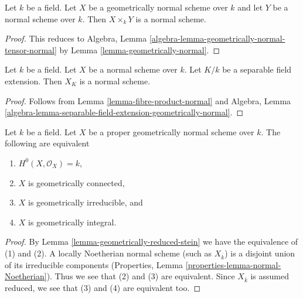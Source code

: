\begin{lemma}
\label{lemma-fibre-product-normal}
Let $k$ be a field. Let $X$ be a geometrically normal scheme over $k$
and let $Y$ be a normal scheme over $k$. Then $X \times_k Y$ is a normal
scheme.
\end{lemma}

\begin{proof}
This reduces to
Algebra, Lemma \ref{algebra-lemma-geometrically-normal-tensor-normal}
by
Lemma \ref{lemma-geometrically-normal}.
\end{proof}

\begin{lemma}
\label{lemma-base-change-normal-by-separable}
Let $k$ be a field. Let $X$ be a normal scheme over $k$. Let $K/k$
be a separable field extension. Then $X_K$ is a normal scheme.
\end{lemma}

\begin{proof}
Follows from Lemma \ref{lemma-fibre-product-normal} and
Algebra, Lemma
\ref{algebra-lemma-separable-field-extension-geometrically-normal}.
\end{proof}

\begin{lemma}
\label{lemma-geometrically-normal-stein}
Let $k$ be a field. Let $X$ be a proper geometrically normal scheme over $k$.
The following are equivalent
\begin{enumerate}
\item $H^0(X, \mathcal{O}_X) = k$,
\item $X$ is geometrically connected,
\item $X$ is geometrically irreducible, and
\item $X$ is geometrically integral.
\end{enumerate}
\end{lemma}

\begin{proof}
By Lemma \ref{lemma-geometrically-reduced-stein} we have the
equivalence of (1) and (2). A locally Noetherian normal scheme
(such as $X_{\overline{k}}$) is a disjoint union of
its irreducible components
(Properties, Lemma \ref{properties-lemma-normal-Noetherian}).
Thus we see that (2) and (3) are equivalent.
Since $X_{\overline{k}}$ is assumed reduced, we see that
(3) and (4) are equivalent too.
\end{proof}









